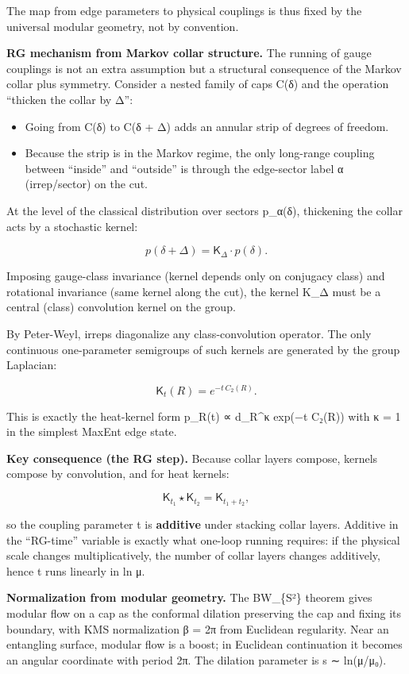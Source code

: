\documentclass[
]{article}
\providecommand{\tightlist}{%
  \setlength{\itemsep}{0pt}\setlength{\parskip}{0pt}}
\begin{document}
The map from edge parameters to physical couplings is thus fixed by the
universal modular geometry, not by convention.

\textbf{RG mechanism from Markov collar structure.} The running of gauge
couplings is not an extra assumption but a structural consequence of the
Markov collar plus symmetry. Consider a nested family of caps C(δ) and
the operation ``thicken the collar by Δ'':

\begin{itemize}
\tightlist
\item
  Going from C(δ) to C(δ + Δ) adds an annular strip of degrees of
  freedom.
\item
  Because the strip is in the Markov regime, the only long-range
  coupling between ``inside'' and ``outside'' is through the edge-sector
  label α (irrep/sector) on the cut.
\end{itemize}

At the level of the classical distribution over sectors p\_α(δ),
thickening the collar acts by a stochastic kernel:

\[
p(\delta + \Delta) = \mathsf{K}_\Delta \cdot p(\delta).
\]

Imposing gauge-class invariance (kernel depends only on conjugacy class)
and rotational invariance (same kernel along the cut), the kernel K\_Δ
must be a central (class) convolution kernel on the group.

By Peter-Weyl, irreps diagonalize any class-convolution operator. The
only continuous one-parameter semigroups of such kernels are generated
by the group Laplacian:

\[
\mathsf{K}_t(R) = e^{-t \, C_2(R)}.
\]

This is exactly the heat-kernel form p\_R(t) ∝ d\_R\^{}κ exp(−t C₂(R))
with κ = 1 in the simplest MaxEnt edge state.

\textbf{Key consequence (the RG step).} Because collar layers compose,
kernels compose by convolution, and for heat kernels:

\[
\mathsf{K}_{t_1} \star \mathsf{K}_{t_2} = \mathsf{K}_{t_1 + t_2},
\]

so the coupling parameter t is \textbf{additive} under stacking collar
layers. Additive in the ``RG-time'' variable is exactly what one-loop
running requires: if the physical scale changes multiplicatively, the
number of collar layers changes additively, hence t runs linearly in ln
μ.

\textbf{Normalization from modular geometry.} The BW\_\{S²\} theorem
gives modular flow on a cap as the conformal dilation preserving the cap
and fixing its boundary, with KMS normalization β = 2π from Euclidean
regularity. Near an entangling surface, modular flow is a boost; in
Euclidean continuation it becomes an angular coordinate with period 2π.
The dilation parameter is s ∼ ln(μ/μ₀).
\end{document}

